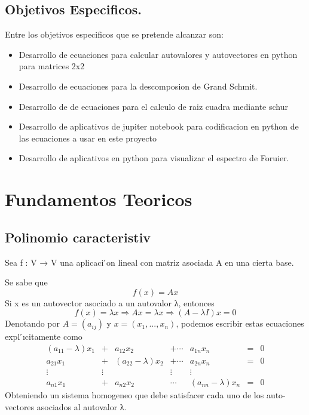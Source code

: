 \documentclass[Spanish,12pt,doublespace,german,letterpaper]{article}
\begin{document}
\subsection{Objetivos Especificos.}
Entre los objetivos especificos que se pretende alcanzar son:
\begin{itemize}
  \item Desarrollo de ecuaciones para calcular autovalores y autovectores en python para matrices 2x2 
  \item Desarrollo de ecuaciones para la descomposion de Grand Schmit.
  \item Desarrollo de de ecuaciones   para el calculo de raiz cuadra mediante schur
  \item Desarrollo de aplicativos de jupiter notebook para codificacion en  python de las ecuaciones a usar en este proyecto
  \item Desarrollo de aplicativos en python para visualizar el espectro de Foruier.
 \end{itemize}
 
\section{Fundamentos Teoricos}
\subsection{Polinomio caracteristiv}
Sea f : V → V una aplicaci ́on lineal con matriz asociada A en una cierta base.


Se sabe que 
$$f(x) = Ax$$ 
Si x es un autovector asociado a un autovalor λ, entonces
$$f(x) = λx ⇒ Ax = λx ⇒ (A − λI)x = 0$$
Denotando por $A = (a_{ij})$ y $x = (x_1,...,x_n)$, podemos escribir estas ecuaciones expl ́ıcitamente como
\begin{equation}
\begin{matrix}
 (a_{11}-\lambda)x_1    & + & a_{12}x_2          & +\cdots & a_{1n}x_n       & =  & 0\\
  a_{21}x_1             & + & (a_{22}-\lambda)x_2  & +\cdots & a_{2n}x_n       & =  & 0\\
 \vdots & \vdots        &        & \vdots & \vdots \\
  a_{n1}x_1             & + & a_{n2}x_2   & \cdots & (a_{nn}-\lambda)x_n &  =  & 0
\end{matrix}
\end{equation}
Obteniendo un sistema homogeneo que debe satisfacer cada uno de los auto-vectores asociados al autovalor λ.
\end{document}
